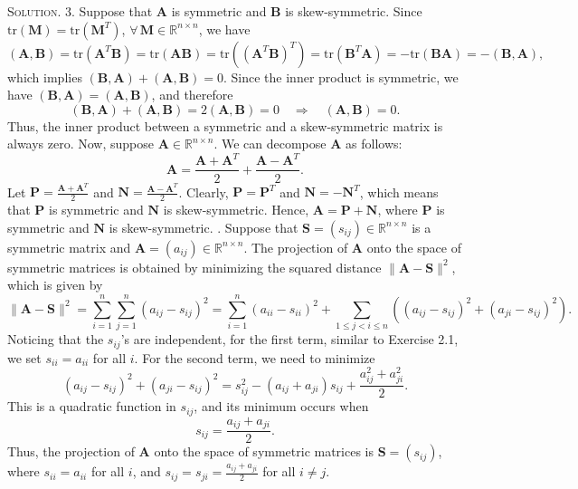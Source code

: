 \documentclass[12pt, a4paper, oneside]{ctexart}
\newenvironment{solution}{\par\noindent\textsc{Solution. }}{\\\par}
\begin{document}
\begin{solution}
	3. Suppose that $\mathbf{A}$ is symmetric and $\mathbf{B}$ is skew-symmetric. Since $\text{tr}(\mathbf{M}) = \text{tr}(\mathbf{M}^{T})$, $\forall\, \mathbf{M} \in \mathbb{R}^{n \times n}$, we have 
	\[
	(\mathbf{A}, \mathbf{B}) = \text{tr}(\mathbf{A}^{T}\mathbf{B}) = \text{tr}(\mathbf{A}\mathbf{B}) = \text{tr}((\mathbf{A}^{T}\mathbf{B})^{T}) = \text{tr}(\mathbf{B}^{T}\mathbf{A}) = -\text{tr}(\mathbf{B}\mathbf{A}) = -(\mathbf{B}, \mathbf{A}),
	\]
	which implies $(\mathbf{B}, \mathbf{A}) + (\mathbf{A}, \mathbf{B}) = 0$. Since the inner product is symmetric, we have $(\mathbf{B}, \mathbf{A}) = (\mathbf{A}, \mathbf{B})$, and therefore
	\[
	(\mathbf{B}, \mathbf{A}) + (\mathbf{A}, \mathbf{B}) = 2(\mathbf{A}, \mathbf{B}) = 0 \quad \Rightarrow \quad (\mathbf{A}, \mathbf{B}) = 0.
	\]
	Thus, the inner product between a symmetric and a skew-symmetric matrix is always zero.
	Now, suppose $\mathbf{A} \in \mathbb{R}^{n \times n}$. We can decompose $\mathbf{A}$ as follows:
	\[
	\mathbf{A} = \frac{\mathbf{A} + \mathbf{A}^{T}}{2} + \frac{\mathbf{A} - \mathbf{A}^{T}}{2}.
	\]
	Let $\mathbf{P} = \frac{\mathbf{A} + \mathbf{A}^{T}}{2}$ and $\mathbf{N} = \frac{\mathbf{A} - \mathbf{A}^{T}}{2}$. Clearly, $\mathbf{P} = \mathbf{P}^{T}$ and $\mathbf{N} = -\mathbf{N}^{T}$, which means that $\mathbf{P}$ is symmetric and $\mathbf{N}$ is skew-symmetric. Hence, $\mathbf{A} = \mathbf{P} + \mathbf{N}$, where $\mathbf{P}$ is symmetric and $\mathbf{N}$ is skew-symmetric.
	\newline{}. Suppose that $\mathbf{S} = (s_{ij}) \in \mathbb{R}^{n \times n}$ is a symmetric matrix and $\mathbf{A} = (a_{ij}) \in \mathbb{R}^{n \times n}$. The projection of $\mathbf{A}$ onto the space of symmetric matrices is obtained by minimizing the squared distance $\|\mathbf{A} - \mathbf{S}\|^{2}$, which is given by
	\[
	\|\mathbf{A} - \mathbf{S}\|^{2} = \sum_{i=1}^{n} \sum_{j=1}^{n} (a_{ij} - s_{ij})^{2} = \sum_{i=1}^{n} (a_{ii} - s_{ii})^{2} + \sum_{1 \leq j < i \leq n} \left( (a_{ij} - s_{ij})^{2} + (a_{ji} - s_{ij})^{2} \right).
	\]
	Noticing that the $s_{ij}$'s are independent, for the first term, similar to Exercise 2.1, we set $s_{ii} = a_{ii}$ for all $i$. For the second term, we need to minimize
	\[
	(a_{ij} - s_{ij})^{2} + (a_{ji} - s_{ij})^{2} = s_{ij}^{2} - (a_{ij} + a_{ji}) s_{ij} + \frac{a_{ij}^{2} + a_{ji}^{2}}{2}.
	\]
	This is a quadratic function in $s_{ij}$, and its minimum occurs when
	\[
	s_{ij} = \frac{a_{ij} + a_{ji}}{2}.
	\]
	Thus, the projection of $\mathbf{A}$ onto the space of symmetric matrices is $\mathbf{S} = (s_{ij})$, where $s_{ii} = a_{ii}$ for all $i$, and $s_{ij} = s_{ji} = \frac{a_{ij} + a_{ji}}{2}$ for all $i \neq j$.
\end{solution}
\end{document}
